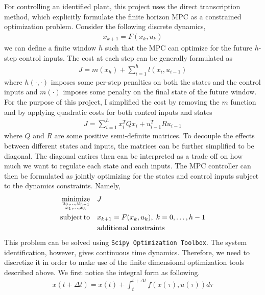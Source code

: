 \documentclass[10pt,twocolumn]{article}
\DeclareMathOperator*{\minimize}{minimize}
\DeclareMathOperator*{\subto}{subject\,to}
\begin{document}
For controlling an identified plant, this project uses the direct transcription method,
which explicitly formulate the finite horizon
MPC as a constrained optimization problem. Consider the following discrete dynamics,
\begin{gather}
  x_{k+1} = F(x_k, u_k)
\end{gather}
we can define a finite window $h$ such that the MPC can optimize for the future $h$-step
control inputs. The cost at each step can be generally formulated as
\begin{gather}
  J = m(x_h) + \sum_{i=1}^h l(x_i, u_{i-1})
\end{gather}
where $h(\cdot, \cdot)$ imposes some per-step penalties on both the states and the control inputs
and $m(\cdot)$ imposes some penalty on the final state of the future window. For the purpose
of this project, I simplified the cost by removing the $m$ function and
by applying quadratic costs for both control inputs and states
\begin{gather}
  J = \sum_{i=1}^h x_i^T Q x_i + u_{i-1}^T R u_{i-1}
\end{gather}
where $Q$ and $R$ are some positive semi-definite matrices.
To decouple the effects between different
states and inputs, the matrices can be further simplified to be diagonal. The diagonal entires
then can be interpreted as a trade off on how much we want to regulate each state and each
inputs. The MPC controller can then be formulated as jointly optimizing for the states and
control inputs subject to the dynamics constraints. Namely,
\begin{gather}
  \begin{aligned}
    \minimize_{\begin{subarray}{c}u_0,\ldots,u_{h-1} \\ x_1,\ldots,x_h\end{subarray}}\quad &J \\
      \subto\quad &x_{k+1} = F(x_k, u_k),\; k=0,\ldots,h-1 \\
      &\text{additional constraints}
  \end{aligned}
\end{gather}
This problem can be solved using \texttt{Scipy Optimization Toolbox}.
The system identification, however, gives continuous time dynamics. Therefore, we need to discretize
it in order to make use of the finite dimensional optimization tools described above.
We first notice the integral form as following.
\begin{gather}
  x(t + \Delta t) = x(t) + \int_t^{t + \Delta t} f(x(\tau), u(\tau)) d\tau
\end{gather}
\end{document}
